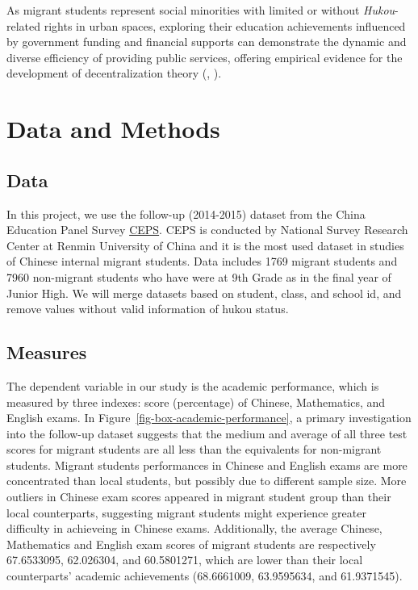 \documentclass[
  man,
  floatsintext,
  longtable,
  nolmodern,
  notxfonts,
  notimes,
  colorlinks=true,linkcolor=blue,citecolor=blue,urlcolor=blue]{apa7}
\begin{document}
As migrant students represent social minorities with limited or without
\emph{Hukou}-related rights in urban spaces, exploring their education
achievements influenced by government funding and financial supports can
demonstrate the dynamic and diverse efficiency of providing public
services, offering empirical evidence for the development of
decentralization theory
(,
).

\section{Data and Methods}\label{data-and-methods}

\subsection{Data}\label{data}

In this project, we use the follow-up (2014-2015) dataset from the China
Education Panel Survey
\href{http://ceps.ruc.edu.cn/English/Home.htm}{CEPS}. CEPS is conducted
by National Survey Research Center at Renmin University of China and it
is the most used dataset in studies of Chinese internal migrant
students. Data includes 1769 migrant students and 7960 non-migrant
students who have were at 9th Grade as in the final year of Junior High.
We will merge datasets based on student, class, and school id, and
remove values without valid information of hukou status.

\subsection{Measures}\label{measures}

The dependent variable in our study is the academic performance, which
is measured by three indexes: score (percentage) of Chinese,
Mathematics, and English exams. In
Figure~\ref{fig-box-academic-performance}, a primary investigation into
the follow-up dataset suggests that the medium and average of all three
test scores for migrant students are all less than the equivalents for
non-migrant students. Migrant students performances in Chinese and
English exams are more concentrated than local students, but possibly
due to different sample size. More outliers in Chinese exam scores
appeared in migrant student group than their local counterparts,
suggesting migrant students might experience greater difficulty in
achieveing in Chinese exams. Additionally, the average Chinese,
Mathematics and English exam scores of migrant students are respectively
67.6533095, 62.026304, and 60.5801271, which are lower than their local
counterparts' academic achievements (68.6661009, 63.9595634, and
61.9371545).
\end{document}

